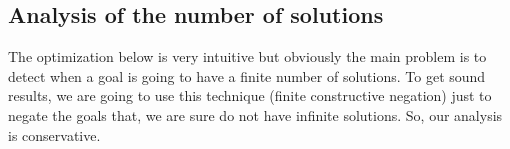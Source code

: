 \documentclass{tlp}
\newtheorem{definition}{Definition} %
\newcommand{\entails}{\models}
\newcommand{\vecy}{\overline{y}}
\begin{document}







\subsection{Analysis of the number of solutions}
\label{cneg:finite_analysis}

The optimization below is very intuitive but obviously the main
problem is to detect when a goal is going to have a finite number of
solutions. To get sound results, we are going to use this technique
(finite constructive negation) just to negate the goals that, we are
sure do not have infinite solutions. So, our analysis is conservative.
\end{document}
